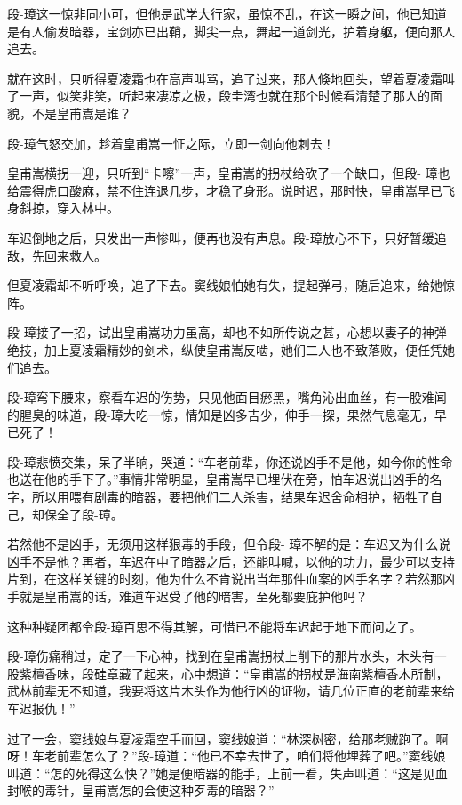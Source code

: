 \documentclass[12pt,oneside]{book}
\begin{document}
段-璋这一惊非同小可，但他是武学大行家，虽惊不乱，在这一瞬之间，他已知道是有人偷发暗器，宝剑亦已出鞘，脚尖一点，舞起一道剑光，护着身躯，便向那人追去。

就在这时，只听得夏凌霜也在高声叫骂，追了过来，那人倏地回头，望着夏凌霜叫了一声，似笑非笑，听起来凄凉之极，段圭湾也就在那个时候看清楚了那人的面貌，不是皇甫嵩是谁？

段-璋气怒交加，趁着皇甫嵩一怔之际，立即一剑向他刺去！

皇甫嵩横拐一迎，只听到``卡嚓''一声，皇甫嵩的拐杖给砍了一个缺口，但段-
璋也给震得虎口酸麻，禁不住连退几步，才稳了身形。说时迟，那时快，皇甫嵩早已飞身斜掠，穿入林中。

车迟倒地之后，只发出一声惨叫，便再也没有声息。段-璋放心不下，只好暂缓追敌，先回来救人。

但夏凌霜却不听呼唤，追了下去。窦线娘怕她有失，提起弹弓，随后追来，给她惊阵。

段-璋接了一招，试出皇甫嵩功力虽高，却也不如所传说之甚，心想以妻子的神弹绝技，加上夏凌霜精妙的剑术，纵使皇甫嵩反啮，她们二人也不致落败，便任凭她们追去。

段-璋弯下腰来，察看车迟的伤势，只见他面目瘀黑，嘴角沁出血丝，有一股难闻的腥臭的味道，段-璋大吃一惊，情知是凶多吉少，伸手一探，果然气息毫无，早已死了！

段-璋悲愤交集，呆了半晌，哭道：``车老前辈，你还说凶手不是他，如今你的性命也送在他的手下了。''事情非常明显，皇甫嵩早已埋伏在旁，怕车迟说出凶手的名字，所以用喂有剧毒的暗器，要把他们二人杀害，结果车迟舍命相护，牺牲了自己，却保全了段-璋。

若然他不是凶手，无须用这样狠毒的手段，但令段-
璋不解的是：车迟又为什么说凶手不是他？再者，车迟在中了暗器之后，还能叫喊，以他的功力，最少可以支持片到，在这样关键的时刻，他为什么不肯说出当年那件血案的凶手名字？若然那凶手就是皇甫嵩的话，难道车迟受了他的暗害，至死都要庇护他吗？

这种种疑团都令段-璋百思不得其解，可惜已不能将车迟起于地下而问之了。

段-璋伤痛稍过，定了一下心神，找到在皇甫嵩拐杖上削下的那片水头，木头有一股紫檀香味，段硅章藏了起来，心中想道：``皇甫嵩的拐杖是海南紫檀香木所制，武林前辈无不知道，我要将这片木头作为他行凶的证物，请几位正直的老前辈来给车迟报仇！''

过了一会，窦线娘与夏凌霜空手而回，窦线娘道：``林深树密，给那老贼跑了。啊呀！车老前辈怎么了？''段-璋道：``他已不幸去世了，咱们将他埋葬了吧。''窦线娘叫道：``怎的死得这么快？''她是便暗器的能手，上前一看，失声叫道：``这是见血封喉的毒针，皇甫嵩怎的会使这种歹毒的暗器？''
\end{document}
